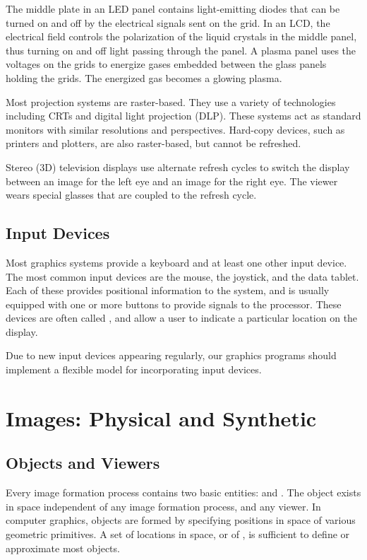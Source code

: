 \documentclass[../COS3712_Notes.tex]{subfiles}
\begin{document}
        The middle plate in an LED panel contains light-emitting diodes
        that can be turned on and off by the electrical signals sent on the grid.
        In an LCD, the electrical field controls the polarization of the liquid crystals in
        the middle panel,
        thus turning on and off light passing through the panel.
        A plasma panel uses the voltages on the grids to energize gases embedded between the
        glass panels holding the grids.
        The energized gas becomes a glowing plasma.

        Most projection systems are raster-based.
        They use a variety of technologies including CRTs and digital light projection (DLP).
        These systems act as standard monitors with similar resolutions and perspectives.
        Hard-copy devices, such as printers and plotters, are also raster-based, but cannot be
        refreshed.

        Stereo (3D) television displays use alternate refresh cycles to switch the display
        between an image for the left eye and an image for the right eye.
        The viewer wears special glasses that are coupled to the refresh cycle.

      \subsection{Input Devices}
        Most graphics systems provide a keyboard and at least one other input device.
        The most common input devices are the mouse, the joystick, and the data tablet.
        Each of these provides positional information to the system,
        and is usually equipped with one or more buttons to provide signals to the processor.
        These devices are often called ,
        and allow a user to indicate a particular location on the display.

        Due to new input devices appearing regularly,
        our graphics programs should implement a flexible model for incorporating input devices.
      \pagebreak

    \section{Images: Physical and Synthetic}
      \subsection{Objects and Viewers}
        Every image formation process contains two basic entities:
         and .
        The object exists in space independent of any image formation process, and any viewer.
        In computer graphics, objects are formed by specifying positions in space of various
        geometric primitives.
        A set of locations in space, or of , is sufficient to define or
        approximate most objects.
\end{document}
